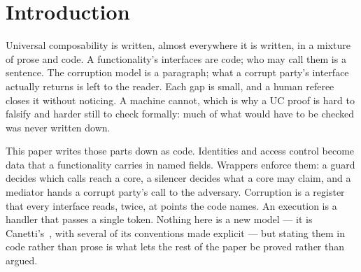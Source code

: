 \documentclass[10pt,oneside,openany]{book}
\makeatletter
\newcommand{\nav@headtext}{}
\newcommand{\chapterheadstar}[1]{\gdef\nav@headtext{#1}}
\theoremstyle{accentdef}
\theoremstyle{accentplain}
\makeatother
\begin{document}
\clearpage
\chapterheadstar{Contents}
\hypertarget{toc}{}%
{\setlength{\parskip}{0pt}\tableofcontents}

{}
\chapter*{Introduction}
\chapterheadstar{Introduction}

Universal composability is written, almost everywhere it is written, in a mixture of prose and
code. A functionality's interfaces are code; who may call them is a sentence. The corruption model
is a paragraph; what a corrupt party's interface actually returns is left to the reader. Each gap
is small, and a human referee closes it without noticing. A machine cannot, which is why a UC proof
is hard to falsify and harder still to check formally: much of what would have to be checked was
never written down.

This paper writes those parts down as code. Identities and access control become data that a
functionality carries in named fields. Wrappers enforce them: a guard decides which calls reach a
core, a silencer decides what a core may claim, and a mediator hands a corrupt party's call to the
adversary. Corruption is a register that every interface reads, twice, at points the code names. An
execution is a handler that passes a single token. Nothing here is a new model --- it is
Canetti's~\cite{Canetti20}, with several of its conventions made explicit --- but stating them in
code rather than prose is what lets the rest of the paper be proved rather than argued.
\end{document}
